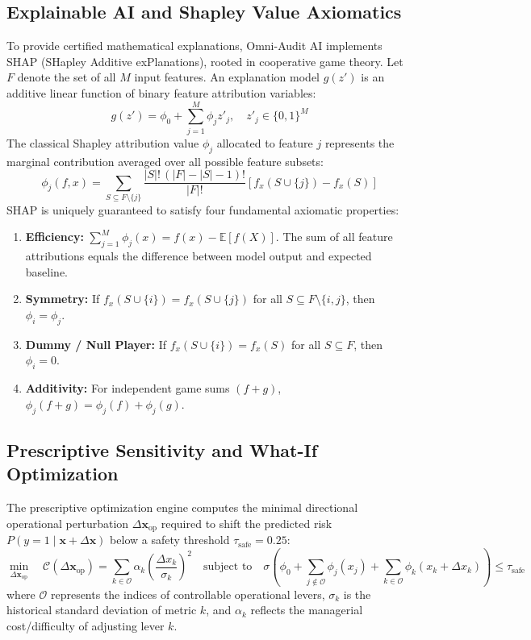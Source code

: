 \documentclass[11pt, a4paper]{article}
\begin{document}
\subsection{Explainable AI and Shapley Value Axiomatics}
To provide certified mathematical explanations, Omni-Audit AI implements SHAP (SHapley Additive exPlanations), rooted in cooperative game theory. Let $F$ denote the set of all $M$ input features. An explanation model $g(z')$ is an additive linear function of binary feature attribution variables:
\begin{equation}
    g(z') = \phi_0 + \sum_{j=1}^M \phi_j z'_j, \quad z'_j \in \{0, 1\}^M
\end{equation}
The classical Shapley attribution value $\phi_j$ allocated to feature $j$ represents the marginal contribution averaged over all possible feature subsets:
\begin{equation}
    \phi_j(f, x) = \sum_{S \subseteq F \setminus \{j\}} \frac{|S|! \, (|F| - |S| - 1)!}{|F|!} \left[ f_x(S \cup \{j\}) - f_x(S) \right]
\end{equation}
SHAP is uniquely guaranteed to satisfy four fundamental axiomatic properties:
\begin{enumerate}
    \item \textbf{Efficiency:} $\sum_{j=1}^M \phi_j(x) = f(x) - \mathbb{E}[f(X)]$. The sum of all feature attributions equals the difference between model output and expected baseline.
    \item \textbf{Symmetry:} If $f_x(S \cup \{i\}) = f_x(S \cup \{j\})$ for all $S \subseteq F \setminus \{i, j\}$, then $\phi_i = \phi_j$.
    \item \textbf{Dummy / Null Player:} If $f_x(S \cup \{i\}) = f_x(S)$ for all $S \subseteq F$, then $\phi_i = 0$.
    \item \textbf{Additivity:} For independent game sums $(f + g)$, $\phi_j(f + g) = \phi_j(f) + \phi_j(g)$.
\end{enumerate}

\subsection{Prescriptive Sensitivity and What-If Optimization}
The prescriptive optimization engine computes the minimal directional operational perturbation $\Delta \mathbf{x}_{\text{op}}$ required to shift the predicted risk $P(y=1 \mid \mathbf{x} + \Delta \mathbf{x})$ below a safety threshold $\tau_{\text{safe}} = 0.25$:
\begin{equation}
    \min_{\Delta \mathbf{x}_{\text{op}}} \quad \mathcal{C}(\Delta \mathbf{x}_{\text{op}}) = \sum_{k \in \mathcal{O}} \alpha_k \left( \frac{\Delta x_k}{\sigma_k} \right)^2 \quad \text{subject to} \quad \sigma\left(\phi_0 + \sum_{j \notin \mathcal{O}} \phi_j(x_j) + \sum_{k \in \mathcal{O}} \phi_k(x_k + \Delta x_k)\right) \le \tau_{\text{safe}}
\end{equation}
where $\mathcal{O}$ represents the indices of controllable operational levers, $\sigma_k$ is the historical standard deviation of metric $k$, and $\alpha_k$ reflects the managerial cost/difficulty of adjusting lever $k$.
\end{document}
